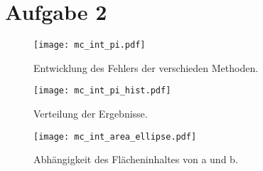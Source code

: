 \documentclass[paper=a4, ngerman]{scrartcl}
\begin{document}
\section{Aufgabe 2}
\begin{figure}[htbp]
	\centering
	\texttt{[image: mc\_int\_pi.pdf]}
	\caption{Entwicklung des Fehlers der verschieden Methoden.}
\end{figure}
\begin{figure}[htbp]
	\centering
	\texttt{[image: mc\_int\_pi\_hist.pdf]}
	\caption{Verteilung der Ergebnisse.}
\end{figure}
\begin{figure}[htbp]
	\centering
	\texttt{[image: mc\_int\_area\_ellipse.pdf]}
	\caption{Abhängigkeit des Flächeninhaltes von a und b.}
\end{figure}
\end{document}

